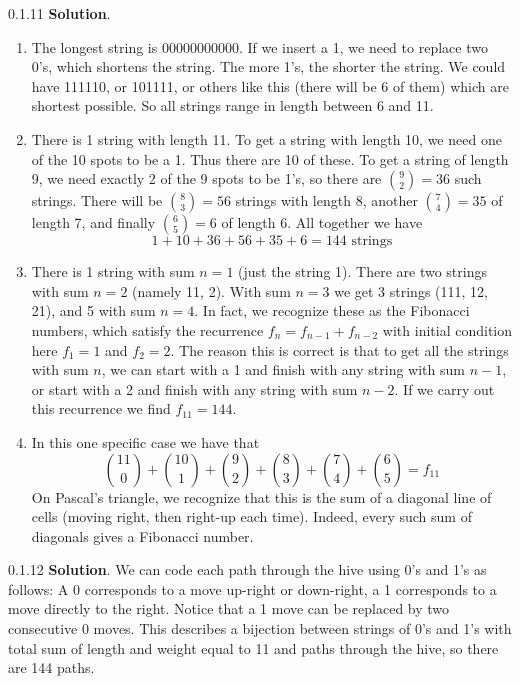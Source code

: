 \documentclass[11pt,]{book}
\theoremstyle{ptxplainnotitle}
\theoremstyle{ptxplaintitle}
\theoremstyle{ptxdefinitionnotitle}
\theoremstyle{ptxdefinitiontitle}
\theoremstyle{ptxdefinitionnotitle}
\theoremstyle{ptxdefinitiontitle}
\theoremstyle{ptxdefinitionnotitle}
\theoremstyle{ptxdefinitiontitle}
\theoremstyle{ptxdefinitiontitlenonumber}
\theoremstyle{ptxdefinitiontitlenonumber}
\numberwithin{equation}{chapter}
\begin{document}
\begin{divisionexercise}{0.1.11}
\textbf{Solution}.\quad%
\hypertarget{p-148}{}%
\leavevmode%
\begin{enumerate}[label=(\alph*)]
\item\hypertarget{li-101}{}\hypertarget{p-149}{}%
The longest string is 00000000000.  If we insert a 1, we need to replace two 0's, which shortens the string.  The more 1's, the shorter the string.  We could have 111110, or 101111, or others like this (there will be 6 of them) which are shortest possible.  So all strings range in length between 6 and 11.%
\item\hypertarget{li-102}{}\hypertarget{p-150}{}%
There is 1 string with length 11.  To get a string with length 10, we need one of the 10 spots to be a 1.  Thus there are 10 of these.  To get a string of length 9, we need exactly 2 of the 9 spots to be 1's, so there are \({9 \choose 2} = 36\) such strings.  There will be \({8 \choose 3} = 56\) strings with length 8, another \({7 \choose 4} = 35\) of length 7, and finally \({6 \choose 5} = 6\) of length 6.  All together we have%
\begin{equation*}
1 + 10 + 36 + 56 + 35 + 6 = 144 \text{ strings}
\end{equation*}
%
\item\hypertarget{li-103}{}\hypertarget{p-151}{}%
There is 1 string with sum \(n = 1\) (just the string 1).  There are two strings with sum \(n = 2\) (namely 11, 2).  With sum \(n = 3\) we get 3 strings (111, 12, 21), and 5 with sum \(n = 4\).  In fact, we recognize these as the Fibonacci numbers, which satisfy the recurrence \(f_n = f_{n-1} + f_{n-2}\) with initial condition here \(f_1 = 1\) and \(f_2 = 2\).  The reason this is correct is that to get all the strings with sum \(n\), we can start with a 1 and finish with any string with sum \(n-1\), or start with a 2 and finish with any string with sum \(n - 2\).  If we carry out this recurrence we find \(f_{11} = 144\).%
\item\hypertarget{li-104}{}\hypertarget{p-152}{}%
In this one specific case we have that%
\begin{equation*}
{11\choose 0} + {10 \choose 1} + {9 \choose 2} + {8 \choose 3} + {7 \choose 4} + {6 \choose 5} = f_{11}
\end{equation*}
On Pascal's triangle, we recognize that this is the sum of a diagonal line of cells (moving right, then right-up each time).  Indeed, every such sum of diagonals gives a Fibonacci number.%
\end{enumerate}
%
\end{divisionexercise}%
\begin{divisionexercise}{0.1.12}
\textbf{Solution}.\quad%
\hypertarget{p-154}{}%
We can code each path through the hive using 0's and 1's as follows:  A 0 corresponds to a move up-right or down-right, a 1 corresponds to a move directly to the right.  Notice that a 1 move can be replaced by two consecutive 0 moves.  This describes a bijection between strings of 0's and 1's with total sum of length and weight equal to 11 and paths through the hive, so there are 144 paths.%
\end{divisionexercise}%
\end{document}
